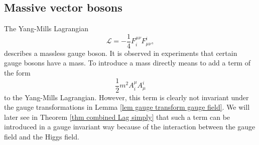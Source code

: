 \documentclass[11pt]{amsart}
\theoremstyle{definition}
\theoremstyle{remark}
\numberwithin{equation}{section}
\begin{document}
\subsection{Massive vector bosons}
The Yang-Mills Lagrangian
\begin{equation*}
\mathcal{L}=-\frac{1}{4}F^{\mu\nu}_iF_{\mu\nu}^i,
\end{equation*}
describes a massless gauge boson. It is observed in experiments that certain gauge bosons have a mass. To introduce a mass directly means to add a term of the form
\begin{equation*}
\frac{1}{2}m^2A^\mu_iA_\mu^i
\end{equation*}
to the Yang-Mills Lagrangian. However, this term is clearly not invariant under the gauge transformations in Lemma \ref{lem gauge transform gauge field}. We will later see in Theorem \ref{thm combined Lag simply} that such a term can be introduced in a gauge invariant way because of the interaction between the gauge field and the Higgs field.
\end{document}
